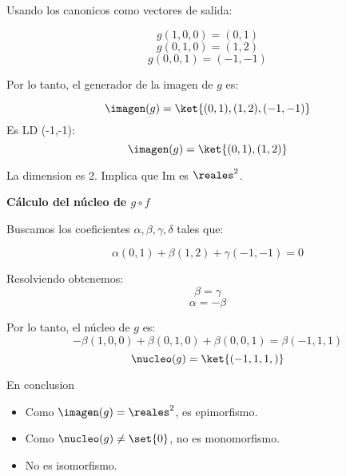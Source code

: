 Usando los canonicos como vectores de salida:

$$ g(1,0,0) = (0,1) $$
$$ g(0,1,0) = (1,2) $$
$$ g(0,0,1) = (-1,-1) $$

Por lo tanto, el generador de la imagen de $ g $ es:

$$ \imagen(g) = \ket{(0,1), (1,2), (-1,-1)} $$
Es LD (-1,-1):
$$ \imagen(g) = \ket{(0,1), (1,2)} $$

La dimension es 2. Implica que Im es $ \reales^2 $.

\textbf{Cálculo del núcleo de $ g \circ f $}

Buscamos los coeficientes $ \alpha, \beta, \gamma, \delta $ tales que:

$$ \alpha(0,1) + \beta(1,2) + \gamma(-1,-1) = 0 $$

Resolviendo obtenemos:
$$ \beta = \gamma$$
$$ \alpha = -\beta $$

Por lo tanto, el núcleo de $ g $ es:
$$ -\beta(1,0,0) + \beta(0,1,0) + \beta(0,0,1) = \beta(-1,1,1) $$
$$ \nucleo(g) = \ket{ (-1,1,1,) } $$

En conclusion

\begin{itemize}
  \item Como $ \imagen(g) = \reales^2 $, es epimorfismo.
  \item Como $ \nucleo(g) \neq \set{0} $, no es monomorfismo.
  \item No es isomorfismo.
\end{itemize}

\begin{aportes}
  \item {}
\end{aportes}
